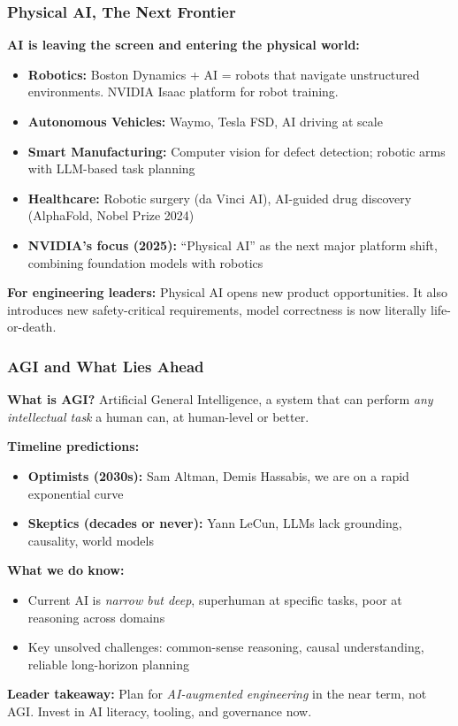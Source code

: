 \begin{frame}[fragile]\frametitle{Physical AI, The Next Frontier}
\textbf{AI is leaving the screen and entering the physical world:}
\begin{itemize}
\item \textbf{Robotics:} Boston Dynamics + AI = robots that navigate unstructured environments. NVIDIA Isaac platform for robot training.
\item \textbf{Autonomous Vehicles:} Waymo, Tesla FSD, AI driving at scale
\item \textbf{Smart Manufacturing:} Computer vision for defect detection; robotic arms with LLM-based task planning
\item \textbf{Healthcare:} Robotic surgery (da Vinci AI), AI-guided drug discovery (AlphaFold, Nobel Prize 2024)
\item \textbf{NVIDIA's focus (2025):} ``Physical AI'' as the next major platform shift, combining foundation models with robotics
\end{itemize}

\textbf{For engineering leaders:} Physical AI opens new product opportunities. It also introduces new safety-critical requirements, model correctness is now literally life-or-death.
\end{frame}

\begin{frame}[fragile]\frametitle{AGI and What Lies Ahead}
\textbf{What is AGI?} Artificial General Intelligence, a system that can perform \textit{any intellectual task} a human can, at human-level or better.

\textbf{Timeline predictions:}
\begin{itemize}
\item \textbf{Optimists (2030s):} Sam Altman, Demis Hassabis, we are on a rapid exponential curve
\item \textbf{Skeptics (decades or never):} Yann LeCun, LLMs lack grounding, causality, world models
\end{itemize}

\textbf{What we do know:}
\begin{itemize}
\item Current AI is \textit{narrow but deep}, superhuman at specific tasks, poor at reasoning across domains
\item Key unsolved challenges: common-sense reasoning, causal understanding, reliable long-horizon planning
\end{itemize}

\textbf{Leader takeaway:} Plan for \textit{AI-augmented engineering} in the near term, not AGI. Invest in AI literacy, tooling, and governance now.
\end{frame}

